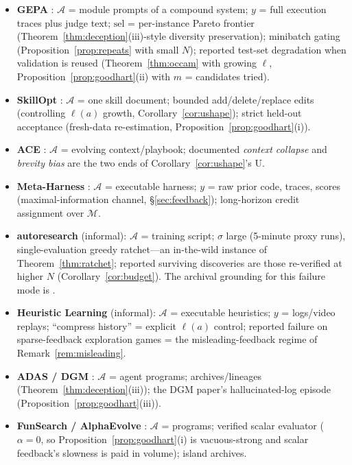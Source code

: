 \documentclass{article}
\theoremstyle{plain}
\theoremstyle{definition}
\theoremstyle{remark}
\newcommand{\A}{\mathcal{A}}
\newcommand{\M}{\mathcal{M}}
\newcommand{\sel}{\mathrm{sel}}
\newcommand{\len}{\ell}
\begin{document}
\begin{itemize}\itemsep2pt
\item \textbf{GEPA} \citep{agrawal2025gepa}: $\A$ = module prompts of a compound system; $y$ = full execution traces plus judge text; $\sel$ = per-instance Pareto frontier (Theorem~\ref{thm:deception}(iii)-style diversity preservation); minibatch gating (Proposition~\ref{prop:repeats} with small $N$); reported test-set degradation when validation is reused (Theorem~\ref{thm:occam} with growing $\len$, Proposition~\ref{prop:goodhart}(ii) with $m$ = candidates tried).
\item \textbf{SkillOpt} \citep{yang2026skillopt}: $\A$ = one skill document; bounded add/delete/replace edits (controlling $\len(a)$ growth, Corollary~\ref{cor:ushape}); strict held-out acceptance (fresh-data re-estimation, Proposition~\ref{prop:goodhart}(i)).
\item \textbf{ACE} \citep{zhang2025ace}: $\A$ = evolving context/playbook; documented \emph{context collapse} and \emph{brevity bias} are the two ends of Corollary~\ref{cor:ushape}'s U.
\item \textbf{Meta-Harness} \citep{lee2026metaharness}: $\A$ = executable harness; $y$ = raw prior code, traces, scores (maximal-information channel, \S\ref{sec:feedback}); long-horizon credit assignment over $\M$.
\item \textbf{autoresearch} \citep{karpathy2026autoresearch} (informal): $\A$ = training script; $\sigma$ large (5-minute proxy runs), single-evaluation greedy ratchet---an in-the-wild instance of Theorem~\ref{thm:ratchet}; reported surviving discoveries are those re-verified at higher $N$ (Corollary~\ref{cor:budget}). The archival grounding for this failure mode is \citet{henderson2018matters,dodge2019show,agarwal2021precipice}.
\item \textbf{Heuristic Learning} \citep{weng2026hl} (informal): $\A$ = executable heuristics; $y$ = logs/video replays; ``compress history'' = explicit $\len(a)$ control; reported failure on sparse-feedback exploration games = the misleading-feedback regime of Remark~\ref{rem:misleading}.
\item \textbf{ADAS / DGM} \citep{hu2025adas, zhang2025dgm}: $\A$ = agent programs; archives/lineages (Theorem~\ref{thm:deception}(iii)); the DGM paper's hallucinated-log episode (Proposition~\ref{prop:goodhart}(iii)).
\item \textbf{FunSearch / AlphaEvolve} \citep{romeraparedes2024funsearch, novikov2025alphaevolve}: $\A$ = programs; verified scalar evaluator ($\alpha = 0$, so Proposition~\ref{prop:goodhart}(i) is vacuous-strong and scalar feedback's slowness is paid in volume); island archives.

\end{itemize}
\end{document}
